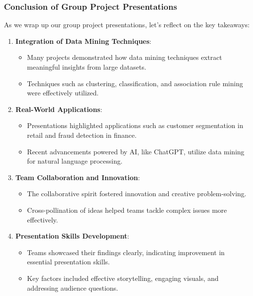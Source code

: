 \documentclass[aspectratio=169]{beamer}
\begin{document}
\begin{frame}[fragile]
    \frametitle{Conclusion of Group Project Presentations}
    
    As we wrap up our group project presentations, let's reflect on the key takeaways:
    
    \begin{enumerate}
        \item \textbf{Integration of Data Mining Techniques}:
        \begin{itemize}
            \item Many projects demonstrated how data mining techniques extract meaningful insights from large datasets.
            \item Techniques such as clustering, classification, and association rule mining were effectively utilized.
        \end{itemize}
        
        \item \textbf{Real-World Applications}:
        \begin{itemize}
            \item Presentations highlighted applications such as customer segmentation in retail and fraud detection in finance.
            \item Recent advancements powered by AI, like ChatGPT, utilize data mining for natural language processing.
        \end{itemize}
        
        \item \textbf{Team Collaboration and Innovation}:
        \begin{itemize}
            \item The collaborative spirit fostered innovation and creative problem-solving.
            \item Cross-pollination of ideas helped teams tackle complex issues more effectively.
        \end{itemize}
        
        \item \textbf{Presentation Skills Development}:
        \begin{itemize}
            \item Teams showcased their findings clearly, indicating improvement in essential presentation skills.
            \item Key factors included effective storytelling, engaging visuals, and addressing audience questions.
        \end{itemize}
    \end{enumerate}
\end{frame}
\end{document}
